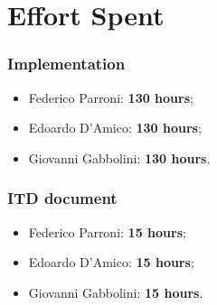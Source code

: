 \chapter{Effort Spent}
\subsection{Implementation}
\begin{itemize}
\item Federico Parroni: \textbf{130 hours};
\item Edoardo D'Amico: \textbf{130 hours};
\item Giovanni Gabbolini: \textbf{130 hours}.
\end{itemize}

\subsection{ITD document}
\begin{itemize}
\item Federico Parroni: \textbf{15 hours};
\item Edoardo D'Amico: \textbf{15 hours};
\item Giovanni Gabbolini: \textbf{15 hours}.
\end{itemize}

